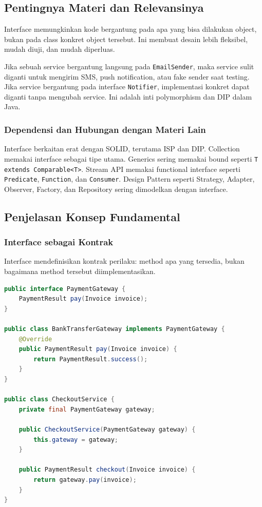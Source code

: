 \subsection{Pentingnya Materi dan Relevansinya}

\begin{jawab}
Interface memungkinkan kode bergantung pada apa yang bisa dilakukan object, bukan pada class konkret object tersebut. Ini membuat desain lebih fleksibel, mudah diuji, dan mudah diperluas.
\end{jawab}

Jika sebuah service bergantung langsung pada \texttt{EmailSender}, maka service sulit diganti untuk mengirim SMS, push notification, atau fake sender saat testing. Jika service bergantung pada interface \texttt{Notifier}, implementasi konkret dapat diganti tanpa mengubah service. Ini adalah inti polymorphism dan DIP dalam Java.

\subsubsection{Dependensi dan Hubungan dengan Materi Lain}

Interface berkaitan erat dengan SOLID, terutama ISP dan DIP. Collection memakai interface sebagai tipe utama. Generics sering memakai bound seperti \texttt{T extends Comparable<T>}. Stream API memakai functional interface seperti \texttt{Predicate}, \texttt{Function}, dan \texttt{Consumer}. Design Pattern seperti Strategy, Adapter, Observer, Factory, dan Repository sering dimodelkan dengan interface.

\subsection{Penjelasan Konsep Fundamental}

\subsubsection{Interface sebagai Kontrak}

\begin{jawab}
Interface mendefinisikan kontrak perilaku: method apa yang tersedia, bukan bagaimana method tersebut diimplementasikan.
\end{jawab}

\begin{lstlisting}[language=Java, caption={Interface dan implementasi konkret}, label={lst:interface-basic}]
public interface PaymentGateway {
    PaymentResult pay(Invoice invoice);
}

public class BankTransferGateway implements PaymentGateway {
    @Override
    public PaymentResult pay(Invoice invoice) {
        return PaymentResult.success();
    }
}

public class CheckoutService {
    private final PaymentGateway gateway;

    public CheckoutService(PaymentGateway gateway) {
        this.gateway = gateway;
    }

    public PaymentResult checkout(Invoice invoice) {
        return gateway.pay(invoice);
    }
}
\end{lstlisting}

